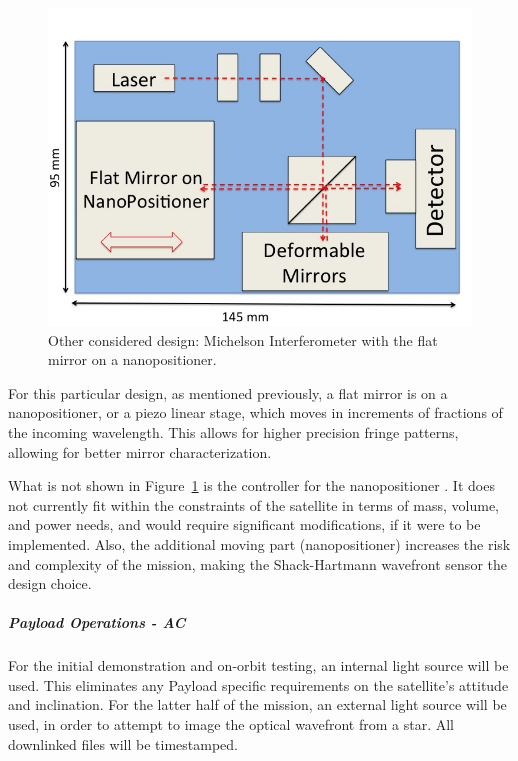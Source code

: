 \documentclass[12pt]{article}
\begin{document}
\begin{figure}[ht]
\centering
  \includegraphics[width=5in]{images/payload_interferometer.jpg}
\caption{Other considered design: Michelson Interferometer with the flat mirror on a nanopositioner.}
\label{fig:interferometer}
\end{figure}

For this particular design, as mentioned previously, a flat mirror is on a nanopositioner, or a piezo linear stage, which moves in increments of fractions of the incoming wavelength. This allows for higher precision fringe patterns, allowing for better mirror characterization.

What is not shown in Figure~\ref{fig:interferometer} is the controller for the nanopositioner \cite{newport_nanopositioner}. It does not currently fit within the constraints of the satellite in terms of mass, volume, and power needs, and would require significant modifications, if it were to be implemented. Also, the additional moving part (nanopositioner) increases the risk and complexity of the mission, making the Shack-Hartmann wavefront sensor the design choice.

\subparagraph{Payload Operations - AC}
For the initial demonstration and on-orbit testing, an internal light
source will be used. This eliminates any Payload specific requirements
on the satellite's attitude and inclination. For the latter half of
the mission, an external light source will be used, in order to attempt to image the optical wavefront from a star.  All downlinked files will be timestamped.
\end{document}
